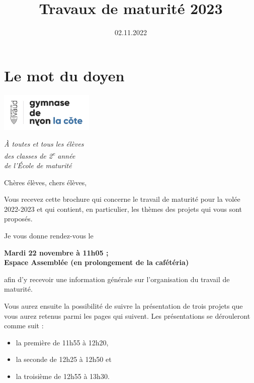 \documentclass[
  10pt,
  french,
  a5paper,
  openany]{book}
\title{Travaux de maturité 2023}
\author{}
\date{\vspace{-2.5em}02.11.2022}
\providecommand{\tightlist}{%
  \setlength{\itemsep}{0pt}\setlength{\parskip}{0pt}}
\newenvironment{signature}{\begin{flushright}}{\end{flushright}}
\begin{document}
\maketitle

{
\setcounter{tocdepth}{0}
\tableofcontents
}
\hypertarget{le-mot-du-doyen}{%
\chapter*{Le mot du doyen}\label{le-mot-du-doyen}}

\includegraphics[width=\textwidth,height=5em]{images/logoGNLC.png}


\begin{signature}
\emph{À toutes et tous les élèves}\\
\emph{des classes de 2\textsuperscript{e} année}\\
\emph{de l'École de maturité}

\end{signature}


Chères élèves, chers élèves,

Vous recevez cette brochure qui concerne le travail de maturité pour la volée 2022-2023 et qui contient, en particulier, les thèmes des projets qui vous sont proposés.

Je vous donne rendez-vous le

\begin{center}
\textbf{Mardi 22 novembre à 11h05 ;\\
Espace Assemblée (en prolongement de la cafétéria)}

\end{center}

afin d'y recevoir une information générale sur l'organisation du travail de maturité.

Vous aurez ensuite la possibilité de suivre la présentation de trois projets que vous aurez retenus parmi les pages qui suivent. Les présentations se dérouleront comme suit :

\begin{itemize}
\tightlist
\item
  la première de 11h55 à 12h20,
\item
  la seconde de 12h25 à 12h50 et
\item
  la troisième de 12h55 à 13h30.
\end{itemize}
\end{document}
